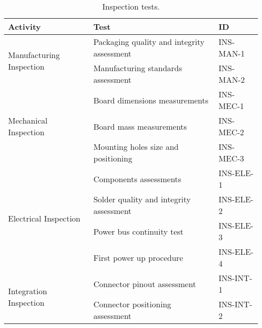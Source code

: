 \begin{table}[htp]
    \small
    \centering
    \begin{tabular}{lll}
        \toprule
        \textbf{Activity}                           & \textbf{Test}                                 & \textbf{ID}   \\
        \midrule
        \midrule
        \multirow{2}{*}{Manufacturing Inspection}   & Packaging quality and integrity assessment    & INS-MAN-1     \\
                                                    & Manufacturing standards assessment            & INS-MAN-2     \\
        \midrule
        \multirow{3}{*}{Mechanical Inspection}      & Board dimensions measurements                 & INS-MEC-1     \\
                                                    & Board mass measurements                       & INS-MEC-2     \\
                                                    & Mounting holes size and positioning           & INS-MEC-3     \\
        \midrule
        \multirow{4}{*}{Electrical Inspection}      & Components assessments                        & INS-ELE-1     \\
                                                    & Solder quality and integrity assessment       & INS-ELE-2     \\
                                                    & Power bus continuity test                     & INS-ELE-3     \\
                                                    & First power up procedure                      & INS-ELE-4     \\
        \midrule
        \multirow{2}{*}{Integration Inspection}     & Connector pinout assessment                   & INS-INT-1     \\
                                                    & Connector positioning assessment              & INS-INT-2     \\
        \bottomrule
    \end{tabular}
    \caption{Inspection tests.}
    \label{tab:inspection-tests}
\end{table}

